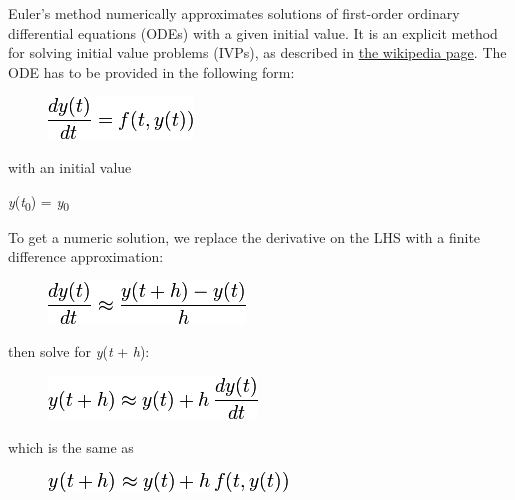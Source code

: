 Euler's method numerically approximates solutions of first-order
ordinary differential equations (ODEs) with a given initial value. It is
an explicit method for solving initial value problems (IVPs), as
described in \href{http://en.wikipedia.org/wiki/Euler\_method}{the
wikipedia page}. The ODE has to be provided in the following form:

\begin{figure}[H]
\centering
\includegraphics[scale=.6]{graphics/42ca594a14ebfe0d38675336c405ca1d.png}
\end{figure}

with an initial value

\emph{y}(\emph{t}\textsubscript{0}) = \emph{y}\textsubscript{0}

To get a numeric solution, we replace the derivative on the LHS with a
finite difference approximation:

\begin{figure}[H]
\centering
\includegraphics[scale=.6]{graphics/74ad42ba372e0541d6f14058e2c33c0f.png}
\end{figure}

then solve for \emph{y}(\emph{t} + \emph{h}):

\begin{figure}[H]
\centering
\includegraphics[scale=.6]{graphics/6ecb4a72d18052ff65e393b54c3850a2.png}
\end{figure}

which is the same as

\begin{figure}[H]
\centering
\includegraphics[scale=.6]{graphics/0a1294f5ac71c931e686c647d900fbcb.png}
\end{figure}

